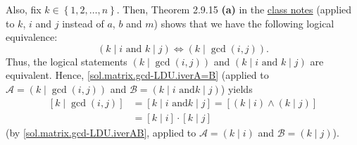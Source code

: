\documentclass[paper=a4, fontsize=12pt]{scrartcl}%
\theoremstyle{plainsl}
\theoremstyle{definition}
\theoremstyle{remark}
\begin{document}
Also, fix $k\in\left\{  1,2,\ldots,n\right\}  $. Then, Theorem 2.9.15
\textbf{(a)} in the
\href{http://www.cip.ifi.lmu.de/~grinberg/t/19s/notes.pdf}{class notes}
(applied to $k$, $i$ and $j$ instead of $a$, $b$ and $m$) shows that we have
the following logical equivalence:%
\[
\left(  k\mid i\text{ and }k\mid j\right)  \Longleftrightarrow\left(
k\mid\gcd\left(  i,j\right)  \right)  .
\]
Thus, the logical statements $\left(  k\mid\gcd\left(  i,j\right)  \right)  $
and $\left(  k\mid i\text{ and }k\mid j\right)  $ are equivalent. Hence,
\eqref{sol.matrix.gcd-LDU.iverA=B} (applied to $\mathcal{A}=\left(  k\mid
\gcd\left(  i,j\right)  \right)  $ and $\mathcal{B}=\left(  k\mid i\text{ and
}k\mid j\right)  $) yields%
\begin{align}
\left[  k\mid\gcd\left(  i,j\right)  \right]   &  =\left[  k\mid i\text{ and
}k\mid j\right]  =\left[  \left(  k\mid i\right)  \wedge\left(  k\mid
j\right)  \right] \nonumber\\
&  =\left[  k\mid i\right]  \cdot\left[  k\mid j\right]
\label{sol.matrix.gcd-LDU.3}%
\end{align}
(by \eqref{sol.matrix.gcd-LDU.iverAB}, applied to $\mathcal{A}=\left(  k\mid
i\right)  $ and $\mathcal{B}=\left(  k\mid j\right)  $).
\end{document}
